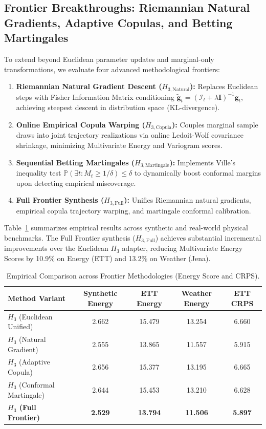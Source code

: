 \documentclass[10pt,journal,compsoc]{IEEEtran}
\begin{document}
\subsection{Frontier Breakthroughs: Riemannian Natural Gradients, Adaptive Copulas, and Betting Martingales}
To extend beyond Euclidean parameter updates and marginal-only transformations, we evaluate four advanced methodological frontiers:
\begin{enumerate}
    \item \textbf{Riemannian Natural Gradient Descent ($H_{3, \text{Natural}}$):} Replaces Euclidean steps with Fisher Information Matrix conditioning $\tilde{\mathbf{g}}_t = (\mathcal{I}_t + \lambda \mathbf{I})^{-1} \mathbf{g}_t$, achieving steepest descent in distribution space (KL-divergence).
    \item \textbf{Online Empirical Copula Warping ($H_{3, \text{Copula}}$):} Couples marginal sample draws into joint trajectory realizations via online Ledoit-Wolf covariance shrinkage, minimizing Multivariate Energy and Variogram scores.
    \item \textbf{Sequential Betting Martingales ($H_{3, \text{Martingale}}$):} Implements Ville's inequality test $\mathbb{P}(\exists t: M_t \ge 1/\delta) \le \delta$ to dynamically boost conformal margins upon detecting empirical miscoverage.
    \item \textbf{Full Frontier Synthesis ($H_{3, \text{Full}}$):} Unifies Riemannian natural gradients, empirical copula trajectory warping, and martingale conformal calibration.
\end{enumerate}

Table~\ref{tab:deep_research_frontier} summarizes empirical results across synthetic and real-world physical benchmarks. The Full Frontier synthesis ($H_{3, \text{Full}}$) achieves substantial incremental improvements over the Euclidean $H_3$ adapter, reducing Multivariate Energy Scores by 10.9\% on Energy (ETT) and 13.2\% on Weather (Jena).

\begin{table}[h!]
\centering
\caption{Empirical Comparison across Frontier Methodologies (Energy Score and CRPS).}
\label{tab:deep_research_frontier}
\begin{tabular}{lcccc}
\toprule
Method Variant & Synthetic Energy & ETT Energy & Weather Energy & ETT CRPS \\
\midrule
$H_3$ (Euclidean Unified) & 2.662 & 15.479 & 13.254 & 6.660 \\
$H_3$ (Natural Gradient) & 2.555 & 13.865 & 11.557 & 5.915 \\
$H_3$ (Adaptive Copula) & 2.656 & 15.377 & 13.195 & 6.665 \\
$H_3$ (Conformal Martingale) & 2.644 & 15.453 & 13.210 & 6.628 \\
\textbf{$H_3$ (Full Frontier)} & \textbf{2.529} & \textbf{13.794} & \textbf{11.506} & \textbf{5.897} \\
\bottomrule
\end{tabular}
\end{table}
\end{document}
